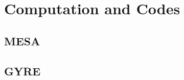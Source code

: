 \section{Computation and Codes}
    
    
{\color{green}    
\subsection{MESA}



}    
    
    
{\color{brown}    
\subsection{GYRE}}
